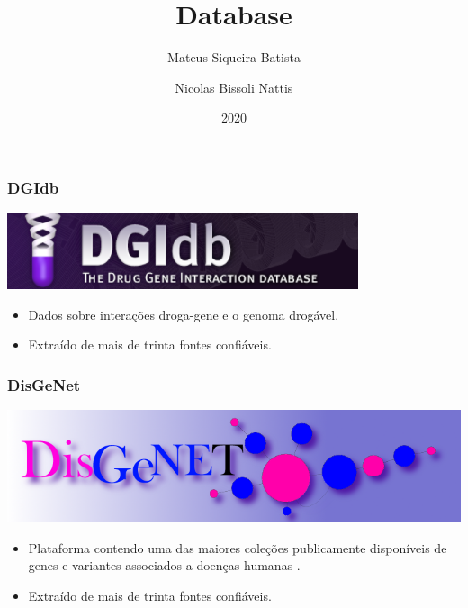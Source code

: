 \documentclass[12pt]{beamer}
\title[Database]{Database}
\author{
  Mateus Siqueira Batista\and
  Nicolas Bissoli Nattis
}
\institute{
  MC536 - Instituto de Computação, UNICAMP
}
\date[2020]{2020}
\begin{document}
\frame{\titlepage}



\begin{frame}
  \frametitle{DGIdb}
  \includegraphics[scale=0.8]{dgi.png}
  \begin{itemize}
    \item {Dados sobre interações droga-gene e o genoma drogável.}
    \item {Extraído de mais de trinta fontes confiáveis.}
  \end{itemize}
\end{frame} 
\begin{frame}
  \frametitle{DisGeNet}
  \includegraphics[scale=0.425]{disgenet.png}
  \begin{itemize}
    \item {Plataforma contendo uma das maiores coleções publicamente disponíveis de genes e variantes associados a doenças humanas
    .}
    \item {Extraído de mais de trinta fontes confiáveis.}
  \end{itemize}
\end{frame} 
\end{document}
